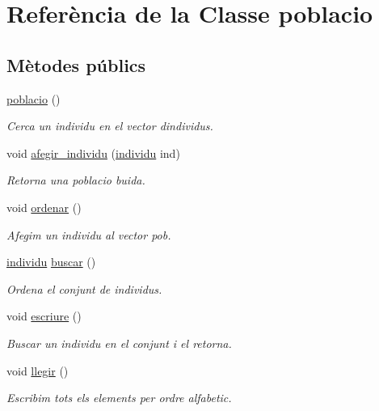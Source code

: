 \hypertarget{classpoblacio}{}\section{Referència de la Classe poblacio}
\label{classpoblacio}
\subsection*{Mètodes públics}
\begin{DoxyCompactItemize}
\item 
\hyperlink{classpoblacio_a8d6ad7ce285dd47c9cfd806e302d7086}{poblacio} ()
\begin{DoxyCompactList}\small\item\em Cerca un individu en el vector d\textquotesingle{}individus. \end{DoxyCompactList}\item 
void \hyperlink{classpoblacio_af65ac83de2f5ac5a9b72895064ff790c}{afegir\+\_\+individu} (\hyperlink{classindividu}{individu} ind)
\begin{DoxyCompactList}\small\item\em Retorna una poblacio buida. \end{DoxyCompactList}\item 
void \hyperlink{classpoblacio_afb671191d5dd2430856367de5b191756}{ordenar} ()
\begin{DoxyCompactList}\small\item\em Afegim un individu al vector pob. \end{DoxyCompactList}\item 
\hyperlink{classindividu}{individu} \hyperlink{classpoblacio_aed7864e5f24d20e68c29cc74eef42935}{buscar} ()
\begin{DoxyCompactList}\small\item\em Ordena el conjunt de individus. \end{DoxyCompactList}\item 
void \hyperlink{classpoblacio_aef82aca848d299bc5eff6d6b479a5081}{escriure} ()
\begin{DoxyCompactList}\small\item\em Buscar un individu en el conjunt i el retorna. \end{DoxyCompactList}\item 
void \hyperlink{classpoblacio_a0fbbb44255553f61cf18af398ad92061}{llegir} ()
\begin{DoxyCompactList}\small\item\em Escribim tots els elements per ordre alfabetic. \end{DoxyCompactList}\end{DoxyCompactItemize}


